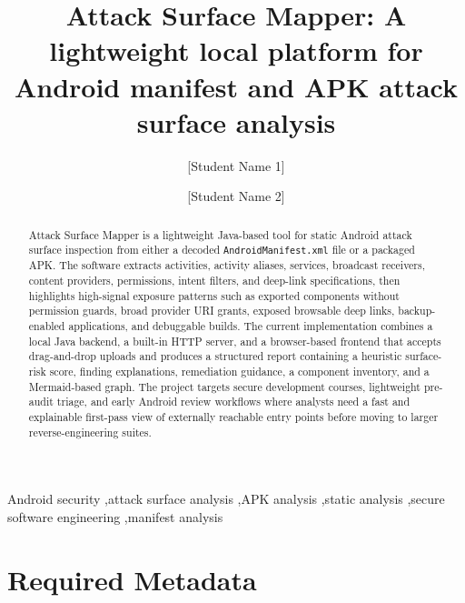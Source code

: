 \documentclass[preprint,12pt,a4paper]{elsarticle}
\begin{document}
\begin{frontmatter}

\title{Attack Surface Mapper: A lightweight local platform for Android manifest and APK attack surface analysis}

\author{[Student Name 1]}
\author{[Student Name 2]}
\address{[Department / School], [University], [City], [Country]}

\begin{abstract}
Attack Surface Mapper is a lightweight Java-based tool for static Android attack surface inspection from either a decoded \texttt{AndroidManifest.xml} file or a packaged APK. The software extracts activities, activity aliases, services, broadcast receivers, content providers, permissions, intent filters, and deep-link specifications, then highlights high-signal exposure patterns such as exported components without permission guards, broad provider URI grants, exposed browsable deep links, backup-enabled applications, and debuggable builds. The current implementation combines a local Java backend, a built-in HTTP server, and a browser-based frontend that accepts drag-and-drop uploads and produces a structured report containing a heuristic surface-risk score, finding explanations, remediation guidance, a component inventory, and a Mermaid-based graph. The project targets secure development courses, lightweight pre-audit triage, and early Android review workflows where analysts need a fast and explainable first-pass view of externally reachable entry points before moving to larger reverse-engineering suites.
\end{abstract}

\begin{keyword}
Android security \sep attack surface analysis \sep APK analysis \sep static analysis \sep secure software engineering \sep manifest analysis
\end{keyword}

\end{frontmatter}

\section*{Required Metadata}
\end{document}
